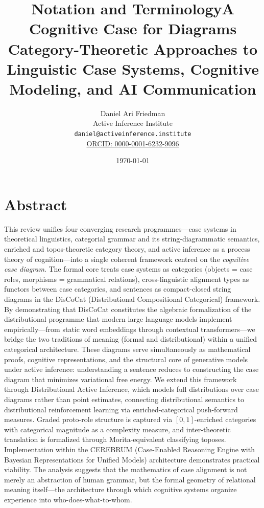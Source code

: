 \documentclass[
]{article}
\title{Notation and Terminology}
\author{}
\date{}
\title{A Cognitive Case for Diagrams\\\normalsize Category-Theoretic Approaches to Linguistic Case Systems, Cognitive Modeling, and AI Communication}
\author{Daniel Ari Friedman\\\footnotesize{Active Inference Institute}\\\footnotesize{\texttt{daniel@activeinference.institute}}\\\footnotesize{\href{https://orcid.org/0000-0001-6232-9096}{ORCID: 0000-0001-6232-9096}}}
\date{\today}
\numberwithin{equation}{section}
\begin{document}
\maketitle
\thispagestyle{empty}
\tableofcontents
\newpage

\section{Abstract}\label{abstract}

This review unifies four converging research programmes---case systems
in theoretical linguistics, categorial grammar and its
string-diagrammatic semantics, enriched and topos-theoretic category
theory, and active inference as a process theory of cognition---into a
single coherent framework centred on the \emph{cognitive case diagram}.
The formal core treats case systems as categories (objects = case roles,
morphisms = grammatical relations), cross-linguistic alignment types as
functors between case categories, and sentences as compact-closed string
diagrams in the DisCoCat (Distributional Compositional Categorical)
framework. By demonstrating that DisCoCat constitutes the algebraic
formalization of the distributional programme that modern large language
models implement empirically---from static word embeddings through
contextual transformers---we bridge the two traditions of meaning
(formal and distributional) within a unified categorical architecture.
These diagrams serve simultaneously as mathematical proofs, cognitive
representations, and the structural core of generative models under
active inference: understanding a sentence reduces to constructing the
case diagram that minimizes variational free energy. We extend this
framework through Distributional Active Inference, which models full
distributions over case diagrams rather than point estimates, connecting
distributional semantics to distributional reinforcement learning via
enriched-categorical push-forward measures. Graded proto-role structure
is captured via \([0,1]\)-enriched categories with categorical magnitude
as a complexity measure, and inter-theoretic translation is formalized
through Morita-equivalent classifying toposes. Implementation within the
CEREBRUM (Case-Enabled Reasoning Engine with Bayesian Representations
for Unified Models) architecture demonstrates practical viability. The
analysis suggests that the mathematics of case alignment is not merely
an abstraction of human grammar, but the formal geometry of relational
meaning itself---the architecture through which cognitive systems
organize experience into who-does-what-to-whom.
\end{document}
